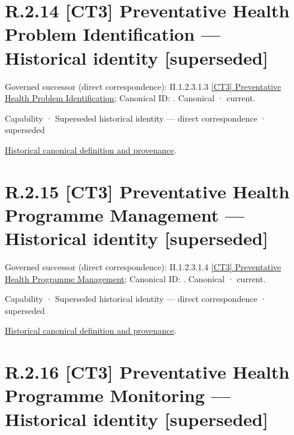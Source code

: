 \section*{R.2.14 [CT3] Preventative Health Problem Identification — Historical identity [superseded]}
\label{navigation:R.2.14}

{\small Governed successor (direct correspondence): II.1.2.3.1.3 \hyperref[element:c1567022671f433fa1eeb37a9d156d92]{[CT3] Preventative Health Problem Identification}; Canonical ID: \texttt{}. Canonical · current.}\par
\label{element:b35d3521141c419fb676a79b2ede40bd}
{\small Capability · Superseded historical identity — direct correspondence · superseded}\par
\href{../../../../continuum/strategy/capability/b35d3521141c419fb676a79b2ede40bd.md}{Historical canonical definition and provenance}.\par
\section*{R.2.15 [CT3] Preventative Health Programme Management — Historical identity [superseded]}
\label{navigation:R.2.15}

{\small Governed successor (direct correspondence): II.1.2.3.1.4 \hyperref[element:563d36b179d34cb6913253d06e8d77f6]{[CT3] Preventative Health Programme Management}; Canonical ID: \texttt{}. Canonical · current.}\par
\label{element:d71def9e76a544ff9761c672bb24f3be}
{\small Capability · Superseded historical identity — direct correspondence · superseded}\par
\href{../../../../continuum/strategy/capability/d71def9e76a544ff9761c672bb24f3be.md}{Historical canonical definition and provenance}.\par
\section*{R.2.16 [CT3] Preventative Health Programme Monitoring — Historical identity [superseded]}
\label{navigation:R.2.16}

